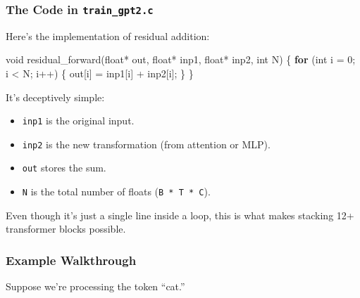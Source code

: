 \documentclass[
  letterpaper,
  DIV=11,
  numbers=noendperiod]{scrreprt}
\newenvironment{Shaded}{\begin{snugshade}}{\end{snugshade}}
\newcommand{\ControlFlowTok}[1]{\textcolor[rgb]{0.00,0.23,0.31}{\textbf{#1}}}
\newcommand{\DataTypeTok}[1]{\textcolor[rgb]{0.68,0.00,0.00}{#1}}
\newcommand{\DecValTok}[1]{\textcolor[rgb]{0.68,0.00,0.00}{#1}}
\newcommand{\NormalTok}[1]{\textcolor[rgb]{0.00,0.23,0.31}{#1}}
\newcommand{\OperatorTok}[1]{\textcolor[rgb]{0.37,0.37,0.37}{#1}}
\providecommand{\tightlist}{%
  \setlength{\itemsep}{0pt}\setlength{\parskip}{0pt}}
\begin{document}
\subsubsection{\texorpdfstring{The Code in
\texttt{train\_gpt2.c}}{The Code in train\_gpt2.c}}\label{the-code-in-train_gpt2.c-1}

Here's the implementation of residual addition:

\begin{Shaded}
\begin{Highlighting}[]
\DataTypeTok{void}\NormalTok{ residual\_forward}\OperatorTok{(}\DataTypeTok{float}\OperatorTok{*}\NormalTok{ out}\OperatorTok{,} \DataTypeTok{float}\OperatorTok{*}\NormalTok{ inp1}\OperatorTok{,} \DataTypeTok{float}\OperatorTok{*}\NormalTok{ inp2}\OperatorTok{,} \DataTypeTok{int}\NormalTok{ N}\OperatorTok{)} \OperatorTok{\{}
    \ControlFlowTok{for} \OperatorTok{(}\DataTypeTok{int}\NormalTok{ i }\OperatorTok{=} \DecValTok{0}\OperatorTok{;}\NormalTok{ i }\OperatorTok{\textless{}}\NormalTok{ N}\OperatorTok{;}\NormalTok{ i}\OperatorTok{++)} \OperatorTok{\{}
\NormalTok{        out}\OperatorTok{[}\NormalTok{i}\OperatorTok{]} \OperatorTok{=}\NormalTok{ inp1}\OperatorTok{[}\NormalTok{i}\OperatorTok{]} \OperatorTok{+}\NormalTok{ inp2}\OperatorTok{[}\NormalTok{i}\OperatorTok{];}
    \OperatorTok{\}}
\OperatorTok{\}}
\end{Highlighting}
\end{Shaded}

It's deceptively simple:

\begin{itemize}
\tightlist
\item
  \texttt{inp1} is the original input.
\item
  \texttt{inp2} is the new transformation (from attention or MLP).
\item
  \texttt{out} stores the sum.
\item
  \texttt{N} is the total number of floats (\texttt{B\ *\ T\ *\ C}).
\end{itemize}

Even though it's just a single line inside a loop, this is what makes
stacking 12+ transformer blocks possible.

\subsubsection{Example Walkthrough}\label{example-walkthrough-2}

Suppose we're processing the token ``cat.''
\end{document}

